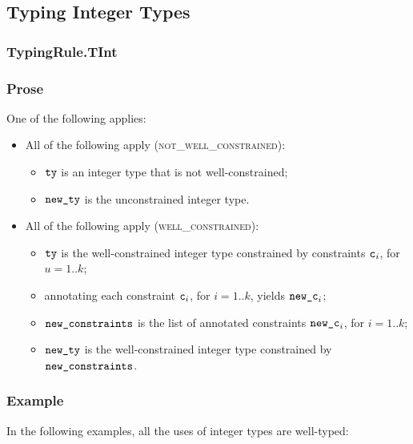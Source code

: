 \subsection{Typing Integer Types\label{sec:TypingIntegerTypes}}
\subsubsection{TypingRule.TInt\label{sec:TypingRule.TInt}}

\subsubsection{Prose}
One of the following applies:
\begin{itemize}
  \item All of the following apply (\textsc{not\_well\_constrained}):
    \begin{itemize}
      \item $\texttt{ty}$ is an integer type that is not well-constrained;
      \item $\texttt{new\_ty}$ is the unconstrained integer type.
    \end{itemize}
  \item All of the following apply (\textsc{well\_constrained}):
    \begin{itemize}
      \item $\texttt{ty}$ is the well-constrained integer type constrained by
        constraints $\texttt{c}_i$, for $u=1..k$;
      \item annotating each constraint $\texttt{c}_i$, for $i=1..k$,
      yields $\texttt{new\_c}_i$\ProseOrTypeError;
      \item $\texttt{new\_constraints}$ is the list of annotated constraints $\texttt{new\_c}_i$,
      for $i=1..k$;
      \item $\texttt{new\_ty}$ is the well-constrained integer type constrained
        by $\texttt{new\_constraints}$.
    \end{itemize}
\end{itemize}

\subsubsection{Example}
In the following examples, all the uses of integer types are well-typed:


